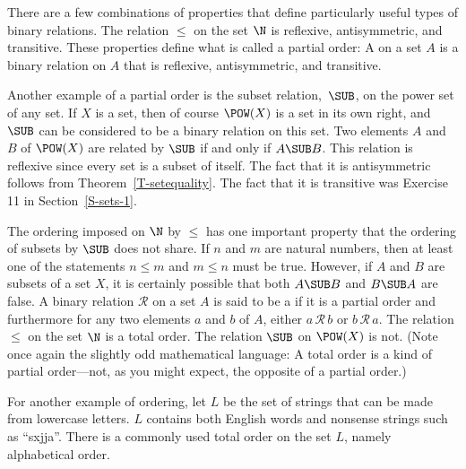 \medbreak

There are a few combinations of properties that define particularly
useful types of binary relations.
The relation $\le$ on the set $\N$ is reflexive, antisymmetric, and
transitive.  These properties define what is called a partial order:
A  on a set $A$ is a binary relation on $A$ that
is reflexive, antisymmetric, and transitive.  

Another example of a partial order is the subset relation,~$\SUB$,
on the power set of any set.  If $X$ is a set, then of course
$\POW(X)$ is a set in its own right, and $\SUB$ can be considered to
be a binary relation on this set.  Two elements $A$ and $B$ of
$\POW(X)$ are related by $\SUB$ if and only if $A\SUB B$.  This
relation is reflexive since every set is a subset of itself.
The fact that it is antisymmetric follows from Theorem~\ref{T-setequality}.
The fact that it is transitive was Exercise 11 in Section~\ref{S-sets-1}.

The ordering imposed on $\N$ by $\le$ has one important property
that the ordering of subsets by $\SUB$ does not share.  If $n$ and
$m$ are natural numbers, then at least one of the statements
$n\le m$ and $m\le n$ must be true.  However, if $A$ and $B$ are
subsets of a set $X$, it is certainly possible that both
$A\SUB B$ and $B\SUB A$ are false.  A binary relation $\mathscr R$ on a set $A$ is said to
be a  if it is a partial order and furthermore
for any two elements $a$ and $b$ of $A$, either $a\,{\mathscr R}\,b$
or $b\,{\mathscr R}\,a$.  The relation $\le$ on the set $\N$ is
a total order.  The relation $\SUB$ on $\POW(X)$ is not.
(Note once again the slightly odd mathematical language:
A total order is a kind of partial order---not, as you might
expect, the opposite of a partial order.)

For another example of ordering, let $L$ be the set of strings
that can be made from lowercase letters.  $L$ contains both
English words and nonsense strings such as ``sxjja''.  There is
a commonly used total order on the set $L$, namely alphabetical
order.

\medskip

